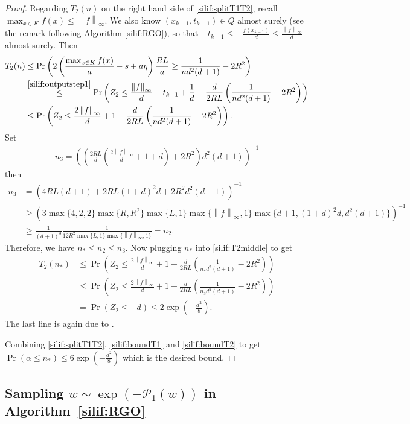 \documentclass[11pt,letterpaper]{article}
\newcommand{\norm}[1]{\left\lVert #1 \right\rVert}
\newcommand{\brac}[1]{\left( #1\right)}
\begin{document}
\begin{proof}
Regarding $T_2(n)$ on the right hand side of \eqref{silif:splitT1T2}, recall $\max_{x\in K}f(x)\leq \norm{f}_\infty$. We also know $(x_{k-1},t_{k-1})\in Q$ almost surely (see the remark following Algorithm \ref{silif:RGO}), so that $-t_{k-1}\leq -\frac{f(x_{k-1})}{d}\leq \frac{\norm{f}_\infty}{d}$ almost surely. Then
\begin{align}
\label{silif:T2middle}
    T_2(n)&\leq \Pr\brac{ 2\brac{\frac{\max_{x\in K}f(x)}{a}-s+a\eta}\frac{RL}{a}\geq \frac{1}{n d^2(d+1)}-2R^2}\nonumber\\
    &\stackrel{\eqref{silif:outputstep1}}{\leq} \Pr\brac{Z_2\leq \frac{\norm{f}_\infty}{d}-t_{k-1}+\frac{1}{d}-\frac{d}{2RL}\brac{\frac{1}{nd^2(d+1)}-2R^2} }\nonumber\\
    &\leq \Pr\brac{Z_2\leq \frac{2\norm{f}_\infty}{d}+1-\frac{d}{2RL}\brac{\frac{1}{nd^2(d+1)}-2R^2} }.
\end{align}
Set 
\begin{align*}
    n_3=\brac{\brac{\frac{2RL}{d}\brac{\frac{2\norm{f}_\infty}{d}+1+d}+2R^2 }d^2(d+1)}^{-1}
\end{align*}
then \begin{align*}
    n_3&=\brac{4RL(d+1)+2RL(1+d)^2d+2R^2 d^2(d+1) }^{-1}\\
    &\geq \brac{3\max\{4,2,2\}\max\{R,R^2\}\max\{L,1\}\max\{\norm{f}_\infty,1\}\max\{d+1,(1+d)^2d,d^2(d+1)\} }^{-1}\\
    &\geq \frac{1}{(d+1)^3}\frac{1}{12R^2 \max\{L,1\}\max\{\norm{f}_\infty,1\} }=n_2.
\end{align*}
Therefore, we have $n_*\leq n_2\leq n_3$. Now plugging $n_*$ into \eqref{silif:T2middle} to get
\begin{align}
\label{silif:boundT2}
    T_2(n_*)&\leq \Pr\brac{Z_2\leq \frac{2\norm{f}_\infty}{d}+1-\frac{d}{2RL}\brac{\frac{1}{n_*d^2(d+1)}-2R^2} }\nonumber\\
   & \leq \Pr\brac{Z_2\leq \frac{2\norm{f}_\infty}{d}+1-\frac{d}{2RL}\brac{\frac{1}{n_3d^2(d+1)}-2R^2} }\nonumber\\
   &=\Pr\brac{ Z_2\leq -d}\leq 2\exp\brac{-\frac{d^2}{8}}.
\end{align}
The last line is again due to \cite[Equation (3.5)]{ledoux2013probability}.  

Combining \eqref{silif:splitT1T2}, \eqref{silif:boundT1} and \eqref{silif:boundT2} to get $ \Pr\brac{\alpha\leq n_*}\leq 6\exp\brac{-\frac{d^2}{8}}$ which is the desired bound. 
\end{proof}


\subsection{Sampling $w\sim \exp\brac{-\mathcal{P}_1(w)}$ in Algorithm~\ref{silif:RGO}}
\label{silif:appen:specialalgo}   
\end{document}
